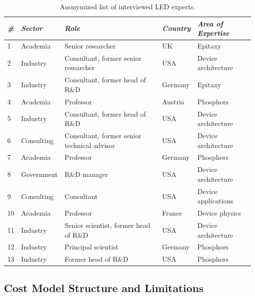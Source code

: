 \documentclass[parskip=full]{article}
\begin{document}
\begin{table}[H]
\small
    \centering
    \caption{Anonymized list of interviewed LED experts.}
    \begin{tabular}{|l|l|l|l|l|}
    \hline
        \textit{\#} & \textit{Sector} & \textit{Role} & \textit{Country} & \textit{Area of Expertise} \\ \hline
        1 & Academia & Senior researcher & UK & Epitaxy \\ \hline
        2 & Industry & Consultant, former senior researcher & USA & Device architecture \\ \hline
        3 & Industry & Consultant, former head of R\&D & Germany & Epitaxy \\ \hline
        4 & Academia & Professor & Austria & Phosphors \\ \hline
        5 & Industry & Consultant, former head of R\&D & USA & Device architecture \\ \hline
        6 & Consulting & Consultant, former senior technical advisor & USA & Device architecture \\ \hline
        7 & Academia & Professor & Germany & Phosphors \\ \hline
        8 & Government & R\&D manager & USA & Device architecture \\ \hline
        9 & Consulting & Consultant & USA & Device applications \\ \hline
        10 & Academia & Professor & France & Device physics \\ \hline
        11 & Industry & Senior scientist, former head of R\&D & USA & Device architecture \\ \hline
        12 & Industry & Principal scientist & Germany & Phosphors \\ \hline
        13 & Industry & Former head of R\&D & USA & Phosphors \\ \hline
    \end{tabular}
    \label{tab:interviews}
\end{table}

\clearpage
\subsection{Cost Model Structure and Limitations}
\label{sec:costmodel_structure}
\end{document}
